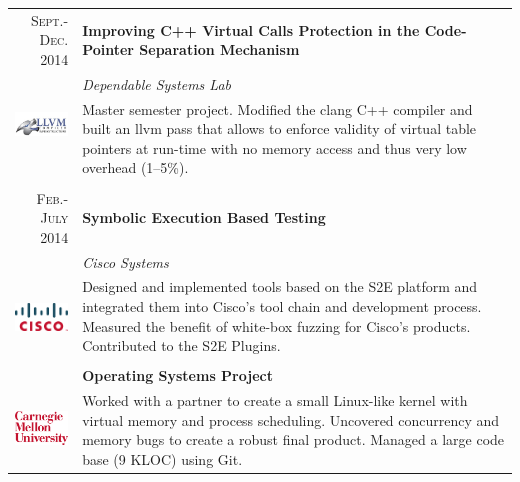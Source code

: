 \documentclass[a4paper,11pt]{article} %
\begin{document}
\begin{tabularx}{\textwidth}{r|X}

\textsc{Sept.-Dec. 2014} & \textbf{Improving C++ Virtual Calls Protection in the Code-Pointer Separation Mechanism} \\
\multirow{2}{*}{ \includegraphics[width=60pt]{img/llvm.eps}}
& \emph{Dependable Systems Lab}\\ 
& \footnotesize{Master semester project. Modified the clang C++ compiler and
built an llvm pass that allows to enforce validity of virtual table pointers at
run-time with no memory access and thus very low overhead (1--5\%).}\\
\multicolumn{2}{c}{} \\


\textsc{Feb.-July 2014} & \textbf{Symbolic Execution Based Testing} \\
\multirow{4}{*}{ \includegraphics[width=60pt]{img/cisco.eps}}
& \emph{Cisco Systems}\\ 
& \footnotesize{Designed and implemented tools based on the S2E platform and
integrated them into Cisco's tool chain and development process. Measured the
benefit of white-box fuzzing for Cisco's products. Contributed to the S2E
Plugins.}\\
\multicolumn{2}{c}{} \\


\textsc{Jan.-May 2013} & \textbf{Operating Systems Project}\\
\multirow{3}{*}{ \includegraphics[width=55pt]{img/cmu.eps}}
& \footnotesize{Worked with a partner to create a small Linux-like kernel
with virtual memory and process scheduling. Uncovered concurrency and memory
bugs to create a robust final product. Managed a large code base (9 KLOC) using Git.}\\


\end{tabularx}
\end{document}
